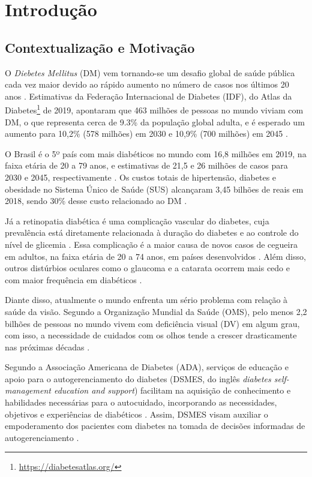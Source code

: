 \chapter{Introdução}
\label{ch:intro}

\section{Contextualização e Motivação}

O \emph{Diebetes Mellitus} (DM) vem tornando-se um desafio global de saúde pública cada vez maior devido ao rápido aumento
no número de casos nos últimos 20 anos \cite{ADA2019}.
Estimativas da Federação Internacional de Diabetes (IDF), do Atlas da Diabetes\footnote{\url{https://diabetesatlas.org/}}
de 2019, apontaram que 463 milhões de pessoas no mundo viviam com DM, o que representa cerca de 9.3\% da população
global adulta, e é esperado um aumento para 10,2\% (578 milhões) em 2030 e 10,9\% (700 milhões) em 2045 \cite{SAEEDI2019107843}.

O Brasil é o 5º país com mais diabéticos no mundo com 16,8 milhões em 2019, na faixa etária de 20 a 79 anos, e estimativas
de 21,5 e 26 milhões de casos para 2030 e 2045, respectivamente \cite{SAEEDI2019107843}. Os custos totais de hipertensão, diabetes
e obesidade no Sistema Único de Saúde (SUS) alcançaram 3,45 bilhões de reais em 2018, sendo 30\% desse custo relacionado ao DM \cite{Nilson2020}.

Já a retinopatia diabética é uma complicação vascular do diabetes, cuja prevalência está diretamente relacionada à duração
do diabetes e ao controle do nível de glicemia \cite{Solomon412}. Essa complicação é a maior causa de novos casos de cegueira
em adultos, na faixa etária de 20 a 74 anos, em países desenvolvidos \cite{ADA2019}. Além disso, outros distúrbios oculares
como o glaucoma e a catarata ocorrem mais cedo e com maior frequência em diabéticos \cite{ADA2019}.

Diante disso, atualmente o mundo enfrenta um sério problema com relação à saúde da visão. Segundo a Organização Mundial da Saúde (OMS),
pelo menos 2,2 bilhões de pessoas no mundo vivem com deficiência visual (DV) em algum grau, com isso,
a necessidade de cuidados com os olhos tende a crescer drasticamente nas próximas décadas \cite{WHO2019}.

Segundo a Associação Americana de Diabetes (ADA), serviços de educação e apoio para o autogerenciamento do diabetes
(DSMES, do inglês \emph{diabetes self-management education and support}) facilitam na aquisição de conhecimento e habilidades
necessárias para o autocuidado, incorporando as necessidades, objetivos e experiências de diabéticos \cite{ADA2019}. Assim, DSMES
visam auxiliar o empoderamento dos pacientes com diabetes na tomada de decisões informadas de autogerenciamento \cite{Marrero2013}.

